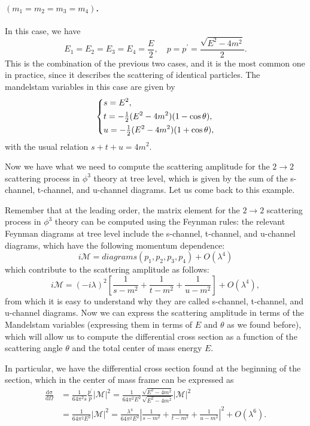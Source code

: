 \paragraph{\((m_1 = m_2 = m_3 = m_4)\).} In this case, we have
\[
    E_1 = E_2 = E_3 = E_4 = \frac{E}{2}, \quad p = p^{\prime} = \frac{\sqrt{E^2 - 4 m^2}}{2}.
\]
This is the combination of the previous two cases, and it is the most common one in practice, since it describes the scattering of identical particles. The mandelstam variables in this case are given by
\[
    \begin{dcases}
        s = E^2,                                         \\
        t = -\tfrac{1}{2}(E^2 - 4 m^2)(1 - \cos \theta), \\
        u = -\tfrac{1}{2}(E^2 - 4 m^2)(1 + \cos \theta),
    \end{dcases}
\]
with the usual relation \(s + t + u = 4 m^2\).

Now we have what we need to compute the scattering amplitude for the \(2 \to 2\) scattering process in \(\phi^3\) theory at tree level, which is given by the sum of the s-channel, t-channel, and u-channel diagrams. Let us come back to this example.

\begin{example}
    Remember that at the leading order, the matrix element for the \(2 \to 2\) scattering process in \(\phi^3\) theory can be computed using the Feynman rules: the relevant Feynman diagrams at tree level include the s-channel, t-channel, and u-channel diagrams, which have the following momentum dependence:
    \[
        i \mathcal{M} = diagrams(p_1, p_2, p_3, p_4) + O(\lambda^4)
    \]
    which contribute to the scattering amplitude as follows:
    \[
        i \mathcal{M} = (-i \lambda)^2 \left[ \frac{1}{s - m^2} + \frac{1}{t - m^2} + \frac{1}{u - m^2} \right] + O(\lambda^4),
    \]
    from which it is easy to understand why they are called s-channel, t-channel, and u-channel diagrams. Now we can express the scattering amplitude in terms of the Mandelstam variables (expressing them in terms of \(E\) and \(\theta\) as we found before), which will allow us to compute the differential cross section as a function of the scattering angle \(\theta\) and the total center of mass energy \(E\).

    In particular, we have the differential cross section found at the beginning of the section, which in the center of mass frame can be expressed as
    \[
        \begin{aligned}
            \frac{\mathrm{d\sigma}}{\mathrm{d} \Omega} & = \frac{1}{64 \pi^2 s} \frac{p^{\prime}}{p} |\mathcal{M}|^2 = \frac{1}{64 \pi^2 E^2} \frac{\sqrt{E^2 - 4 m^2}}{\sqrt{E^2 - 4 m^2}} |\mathcal{M}|^2                   \\
                                                       & = \frac{1}{64 \pi^2 E^2} |\mathcal{M}|^2 = \frac{\lambda^4}{64 \pi^2 E^2} \left| \frac{1}{s - m^2} + \frac{1}{t - m^2} + \frac{1}{u - m^2} \right|^2 + O(\lambda^6).
        \end{aligned}
    \]
\end{example}


